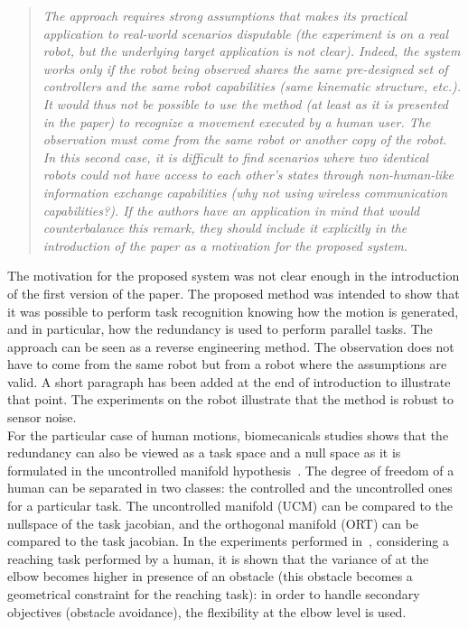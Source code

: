 \documentclass[11pt]{article}
\begin{document}
\begin{quote}
\textit{
The approach requires strong assumptions that makes its practical application to real-world scenarios disputable (the experiment is on a real robot, but the underlying target application is not clear). Indeed, the system works only if the robot being observed shares the same pre-designed set of controllers and the same robot capabilities (same kinematic structure, etc.). It would thus not be possible to use the method (at least as it is presented in the paper) to recognize a movement executed by a human user. The observation must come from the same robot or another copy of the robot. In this second case, it is difficult to find scenarios where two identical robots could not have access to each other's states through non-human-like information exchange capabilities (why not using wireless communication capabilities?). If the authors have an application in mind that would counterbalance this remark, they should include it explicitly in the introduction of the paper as a motivation for the proposed system.
}
\end{quote}
The motivation for the proposed system was not clear enough in the introduction of the first version of the paper.
The proposed method was intended to show that it was possible to perform task recognition 
knowing how the motion is generated, and in particular, how the redundancy
is used to perform parallel tasks. The approach can be seen as a reverse engineering method.
The observation does not have to come from the same robot but from a robot where the 
assumptions are valid. A short paragraph has been added at the end of introduction to
illustrate that point. The experiments on the robot illustrate that the method 
is robust to sensor noise.\\

For the particular case of human motions, biomecanicals studies
shows that the redundancy can also be viewed as a task space and a null space as it 
is formulated in the uncontrolled manifold hypothesis~\cite{scholz99}.
The degree of freedom of a human can be separated in two classes:
the controlled and the uncontrolled ones for a particular task.
The uncontrolled manifold (UCM) can be compared to the nullspace of the task jacobian,
and the orthogonal manifold (ORT) can be compared to the task jacobian.
In the experiments performed in~\cite{jacquierbret09},
considering a reaching task performed by a human, it is shown that the variance
of at the elbow becomes higher in presence of an obstacle (this obstacle becomes 
a geometrical constraint for the reaching task): in order to handle 
secondary objectives (obstacle avoidance), the flexibility at the elbow level is used.\\
\end{document}
